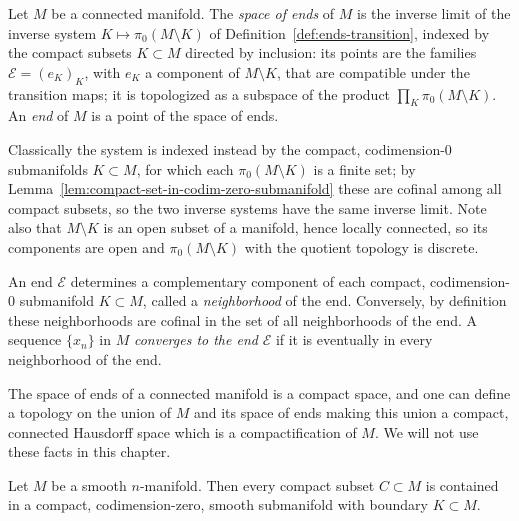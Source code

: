 \begin{definition}
\label{def:space-of-ends}
\leanok
{}
Let $M$ be a connected manifold. The {\em space of ends} of $M$ is
the inverse limit of the inverse system $K\mapsto\pi_0(M\setminus
K)$ of Definition~\ref{def:ends-transition}, indexed by the compact
subsets $K\subset M$ directed by inclusion: its points are the
families ${\mathcal E}=(e_K)_K$, with $e_K$ a component of
$M\setminus K$, that are compatible under the transition maps; it is
topologized as a subspace of the product $\prod_K\pi_0(M\setminus
K)$. An {\em end} of $M$ is a point of the space of ends.

Classically the system is indexed instead by the compact,
codimension-$0$ submanifolds $K\subset M$, for which each
$\pi_0(M\setminus K)$ is a finite set; by
Lemma~\ref{lem:compact-set-in-codim-zero-submanifold} these are
cofinal among all compact subsets, so the two inverse systems have
the same inverse limit. Note also that $M\setminus K$ is an open
subset of a manifold, hence locally connected, so its components are
open and $\pi_0(M\setminus K)$ with the quotient topology is
discrete.

An end ${\mathcal E}$ determines a complementary component of each
compact, codimension-$0$ submanifold $K\subset M$, called a {\em
neighborhood} of the end. Conversely, by definition these
neighborhoods are cofinal in the set of all neighborhoods of the
end. A sequence $\{x_n\}$ in $M$ {\em converges to the end}
${\mathcal E}$ if it is eventually in every neighborhood of the end.
\end{definition}

\begin{remark}
\label{rem:ends-compactification}
The space of ends of a connected manifold is a compact space, and
one can define a topology on the union of $M$ and its space of ends
making this union a compact, connected Hausdorff space which is a
compactification of $M$. We will not use these facts in this
chapter.
\end{remark}

\begin{lemma}
\label{lem:compact-set-in-codim-zero-submanifold}
Let $M$ be a smooth $n$-manifold. Then every compact subset $C\subset
M$ is contained in a compact, codimension-zero, smooth submanifold
with boundary $K\subset M$.
\end{lemma}

